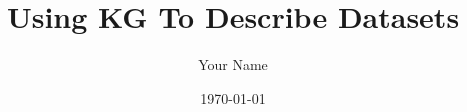 \documentclass[xcolor=svgnames]{beamer}
\title{Using KG To Describe Datasets}
\author{Your Name}
\date{\today}
\begin{document}
\frame{\titlepage}


\end{document}
